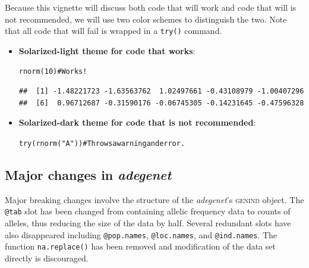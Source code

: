 \documentclass[letterpaper]{article}\usepackage[]{graphicx}\usepackage[]{color}
\makeatletter
\newcommand{\hlnum}[1]{\textcolor[rgb]{0.863,0.196,0.184}{#1}}%
\newcommand{\hlstr}[1]{\textcolor[rgb]{0.863,0.196,0.184}{#1}}%
\newcommand{\hlcom}[1]{\textcolor[rgb]{0.576,0.631,0.631}{#1}}%
\newcommand{\hlstd}[1]{\textcolor[rgb]{0.396,0.482,0.514}{#1}}%
\newcommand{\hlkwd}[1]{\textcolor[rgb]{0.345,0.431,0.459}{#1}}%
\newenvironment{kframe}{%
 \def\at@end@of@kframe{}%
 \ifinner\ifhmode%
  \def\at@end@of@kframe{\end{minipage}}%
  \begin{minipage}{\columnwidth}%
 \fi\fi%
 \def\FrameCommand##1{\hskip\@totalleftmargin \hskip-\fboxsep
 \colorbox{shadecolor}{##1}\hskip-\fboxsep
     \hskip-\linewidth \hskip-\@totalleftmargin \hskip\columnwidth}%
 \MakeFramed {\advance\hsize-\width
   \@totalleftmargin\z@ \linewidth\hsize
   \@setminipage}}%
 {\par\unskip\endMakeFramed%
 \at@end@of@kframe}
\newenvironment{knitrout}{}{} %
\newcommand{\adegenet}{\textit{adegenet}}
\makeatother
\begin{document}
Because this vignette will discuss both code that will work and code that will
is not recommended, we will use two color schemes to distinguish the two. Note
that all code that will fail is wrapped in a \texttt{try()} command.
\begin{itemize}
\item \textbf{Solarized-light theme for code that works}:
\begin{knitrout}
\color{fgcolor}\begin{kframe}
\begin{alltt}
\hlkwd{rnorm}\hlstd{(}\hlnum{10}\hlstd{)} \hlcom{# Works!}
\end{alltt}
\begin{verbatim}
##  [1] -1.48221723 -1.63563762  1.02497661 -0.43108979 -1.00407296
##  [6]  0.96712687 -0.31590176 -0.06745305 -0.14231645 -0.47596328
\end{verbatim}
\end{kframe}
\end{knitrout}



\item \textbf{Solarized-dark theme for code that is not recommended}:
\begin{knitrout}
\color{fgcolor}\begin{kframe}
\begin{alltt}
\hlkwd{try}\hlstd{(}\hlkwd{rnorm}\hlstd{(}\hlstr{"A"}\hlstd{))} \hlcom{# Throws a warning and error.}
\end{alltt}


{\ttfamily\noindent{}}\end{kframe}
\end{knitrout}


\end{itemize}
\subsection{Major changes in \adegenet{}}

Major breaking changes involve the structure of the \adegenet{}'s \textsc{genind}
object. The \texttt{@tab} slot has been changed from containing allelic frequency
data to counts of alleles, thus reducing the size of the data by half. Several
redundant slots have also disappeared including \texttt{@pop.names}, 
\texttt{@loc.names}, and \texttt{@ind.names}. The function \texttt{na.replace()}
has been removed and modification of the data set directly is discouraged. 
\end{document}
